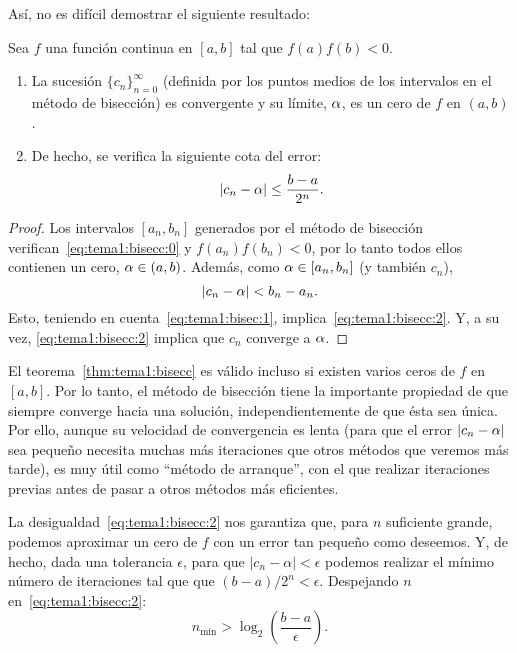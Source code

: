 Así, no es difícil demostrar el siguiente resultado:
\begin{theorem}
  \label{thm:tema1:bisecc}
  Sea $f$ una función continua en $[a,b]$ tal que $f(a)f(b)<0$.
  \begin{enumerate}
  \item La sucesión $\{c_n\}_{n=0}^\infty$ (definida por los puntos
    medios de los intervalos en el método de bisección) es convergente
    y su límite, $\alpha$, es un cero de $f$ en $(a,b)$.
  \item De hecho, se verifica la siguiente cota del error:
    \begin{equation}
      \label{eq:tema1:bisecc:2}
      |c_n-\alpha| \le \frac{b-a}{2^n}.
    \end{equation}
  \end{enumerate}
\end{theorem}

\begin{proof}
  Los intervalos $[a_n,b_n]$ generados por el método de bisección
  verifican~\eqref{eq:tema1:bisecc:0} y $f(a_n)f(b_n)<0$, por lo tanto
  todos ellos contienen un cero, $\alpha\in (a,b)$. Además, como
  $\alpha\in [a_n,b_n]$ (y también $c_n$),
  $$
  |c_n - \alpha| < b_n - a_n.
  $$
  Esto, teniendo en cuenta~\eqref{eq:tema1:bisec:1},
  implica~\eqref{eq:tema1:bisecc:2}. Y, a su vez,
  \eqref{eq:tema1:bisecc:2} implica que $c_n$ converge a $\alpha$.
\end{proof}

\begin{remark}
  \label{rk:tema1:unicidad-bisecc}
  El teorema~\ref{thm:tema1:bisecc} es válido incluso si existen
  varios ceros de $f$ en $[a,b]$. Por lo tanto, el método de bisección
  tiene la importante propiedad de que siempre converge hacia una
  solución, independientemente de que ésta sea única. Por ello, aunque
  su velocidad de convergencia es lenta (para que el error
  $|c_n-\alpha|$ sea pequeño necesita muchas más iteraciones que otros
  métodos que veremos más tarde), es muy útil como ``método de
  arranque'', con el que realizar iteraciones previas antes de pasar a
  otros métodos más eficientes.
\end{remark}

\begin{remark}
  \label{rk:tema1:bisecc:iteraciones}
  La desigualdad~\eqref{eq:tema1:bisecc:2} nos garantiza que, para $n$
  suficiente grande, podemos aproximar un cero de $f$ con un error tan
  pequeño como deseemos. Y, de hecho, dada una tolerancia $\epsilon$,
  para que $|c_n-\alpha|<\epsilon$ podemos realizar el mínimo número de
  iteraciones tal que que $(b-a)/2^n < \epsilon$. Despejando $n$
  en~\eqref{eq:tema1:bisecc:2}:
  \begin{equation*}
    n_{\text{mín}}>\log_2\left(\frac{b-a}{\epsilon}\right).
  \end{equation*}
\end{remark}



